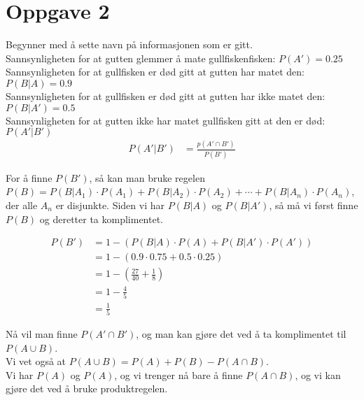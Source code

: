 \documentclass[12pt, a4paper]{article}
\begin{document}
\newpage

\section*{Oppgave 2}

Begynner med å sette navn på informasjonen som er gitt. \\
Sannsynligheten for at gutten glemmer å mate gullfiskenfisken: $P(A') = 0.25$ \\
Sannsynligheten for at gullfisken er død gitt at gutten har matet den: $P(B | A) = 0.9$ \\
Sannsynligheten for at gullfisken er død gitt at gutten har ikke matet den: $P(B | A') = 0.5$ \\
Sannsynligheten for at gutten ikke har matet gullfisken gitt at den er død: $P(A' | B')$ \\

\begin{equation}
    \begin{split}
        P(A' | B') &= \frac{p(A' \cap B')}{P(B')}
    \end{split}
\end{equation}

For å finne $P(B')$, så kan man bruke regelen $P(B) = P(B|A_1) \cdot P(A_1) + P(B|A_2) \cdot P(A_2) + \cdots + P(B|A_n) \cdot P(A_n)$, der alle $A_n$ er disjunkte.
Siden vi har $P(B|A)$ og $P(B|A')$, så må vi først finne $P(B)$ og deretter ta komplimentet.

\begin{equation}
    \begin{split}
        P(B') &= 1 - (P(B|A) \cdot P(A) + P(B|A') \cdot P(A')) \\
              &= 1 - (0.9 \cdot 0.75 + 0.5 \cdot 0.25) \\
              &= 1 - (\frac{27}{40} + \frac{1}{8}) \\
              &= 1 - \frac{4}{5} \\
              &= \frac{1}{5}
    \end{split}
\end{equation}

Nå vil man finne $P(A' \cap B')$, og man kan gjøre det ved å ta komplimentet til $P(A \cup B)$. \\
Vi vet også at $P(A \cup B) = P(A) + P(B) - P(A \cap B)$. \\
Vi har $P(A)$ og $P(A)$, og vi trenger nå bare å finne $P(A \cap B)$, og vi kan gjøre det ved å bruke produktregelen.
\end{document}
